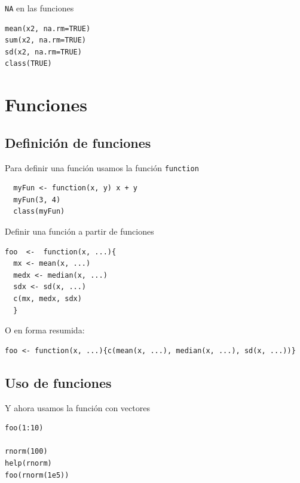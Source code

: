 \documentclass[xcolor={usenames,svgnames,dvipsnames}]{beamer}
\begin{document}
\begin{frame}[fragile,label=sec-2-3-3]{\texttt{NA} en las funciones}
 \lstset{language=R,label= ,caption= ,numbers=none}
\begin{lstlisting}
mean(x2, na.rm=TRUE)
sum(x2, na.rm=TRUE)
sd(x2, na.rm=TRUE)
class(TRUE)
\end{lstlisting}
\end{frame}


\section{Funciones}
\label{sec-3}

\subsection{Definición de funciones}
\label{sec-3-1}
\begin{frame}[fragile,label=sec-3-1-1]{Para definir una función usamos la función \texttt{function}}
 \lstset{language=R,label= ,caption= ,numbers=none}
\begin{lstlisting}
  myFun <- function(x, y) x + y
  myFun(3, 4)
  class(myFun)
\end{lstlisting}
\end{frame}

\begin{frame}[fragile,label=sec-3-1-2]{Definir una función a partir de funciones}
 \lstset{language=R,label= ,caption= ,numbers=none}
\begin{lstlisting}
foo  <-  function(x, ...){
  mx <- mean(x, ...)
  medx <- median(x, ...)
  sdx <- sd(x, ...)
  c(mx, medx, sdx)
  }
\end{lstlisting}
O en forma resumida:
\lstset{language=R,label= ,caption= ,numbers=none}
\begin{lstlisting}
foo <- function(x, ...){c(mean(x, ...), median(x, ...), sd(x, ...))}
\end{lstlisting}
\end{frame}


\subsection{Uso de funciones}
\label{sec-3-2}
\begin{frame}[fragile,label=sec-3-2-1]{Y ahora usamos la función con vectores}
 \lstset{language=R,label= ,caption= ,numbers=none}
\begin{lstlisting}
foo(1:10)

rnorm(100)
help(rnorm)
foo(rnorm(1e5))
\end{lstlisting}
\end{frame}
\end{document}
